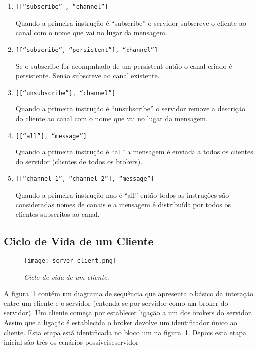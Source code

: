 \begin{enumerate}
\item
\texttt{[[``subscribe''], ``channel'']}

Quando a primeira instrução é ``subscribe'' o servidor subscreve o cliente ao canal com o nome que vai no lugar da mensagem.

\item
\texttt{[[``subscribe'', ``persistent''], ``channel'']}

Se o subscribe for acompnhado de um persistent então o canal criado é persistente. Senão subscreve ao canal existente.

\item
\texttt{[[``unsubscribe''], ``channel'']}

Quando a primeira instrução é ``unsubscribe'' o servidor remove a descrição do cliente ao canal com o nome que vai no lugar da mensagem.

\item
\texttt{[[``all''], ``message'']}

Quando a primeira instrução é ``all'' a mensagem é enviada a todos os clientes do servidor (clientes de todos os brokers).

\item
\texttt{[[``channel 1'', ``channel 2''], ``message'']}

Quando a primeira instrução nao é ``all'' então todos as instruções são consideradas nomes de canais e a mensagem é distribuída por todos os clientes subscritos ao canal.

\end{enumerate}

\subsection{Ciclo de Vida de um Cliente}

\begin{figure}[H]
\centering
\texttt{[image: server\_client.png]}
\caption{\textit{Ciclo de vida de um cliente.}}
\label{fig:server-client}
\end{figure}

A figura~\ref{fig:server-client} contém um diagrama de sequência que apresenta o básico da interação entre um cliente e o servidor (entenda-se por servidor como um broker do servidor).
Um cliente começa por establecer ligação a um dos brokers do servidor. Assim que a ligação é establecida o broker devolve um identificador único ao cliente. Esta etapa está identificada no bloco um na figura~\ref{fig:server-client}. Depois esta etapa inicial são três os cenários possíveiseservidor

